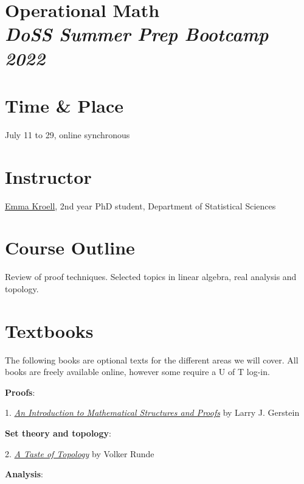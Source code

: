 \documentclass[12pt]{article}
\date{ }
\begin{document}
\section*{Operational Math\\  {\it{DoSS Summer Prep Bootcamp 2022}}}

\section{Time \& Place}
July 11 to 29, online synchronous

\section{Instructor}
\href{https://www.emmakroell.ca}{Emma Kroell}, 2nd year PhD student, Department of Statistical Sciences


\section{Course Outline}
Review of proof techniques. Selected topics in linear algebra, real analysis and topology.

\section{Textbooks}
The following books are optional texts for the different areas we will cover. All books are freely available online, however some require a U of T log-in.

\vspace{1em}

\noindent
{\bf{Proofs}}:
\vspace{0.1cm}

1. \href{https://link-springer-com.myaccess.library.utoronto.ca/book/10.1007/978-1-4614-4265-3}{{\emph{An Introduction to Mathematical Structures and Proofs}}} by Larry J. Gerstein

\vspace{1em}

\noindent
{\bf{Set theory and topology}}:
\vspace{0.1cm}

2. \href{https://link-springer-com.myaccess.library.utoronto.ca/book/10.1007/0-387-28387-0}{\emph{A Taste of Topology}} by Volker Runde

\vspace{1em}


\noindent
{\bf{Analysis}}:
\vspace{0.1cm}
\end{document}
